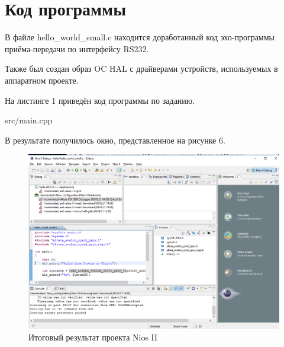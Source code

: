 \section*{Код программы}
В файле hello\_world\_small.c находится доработанный код эхо-программы приёма-передачи по интерфейсу RS232.

Также был создан образ OC HAL с драйверами устройств, используемых в аппаратном проекте.

На листинге 1 приведён код программы по заданию.

\FloatBarrier
\begin{lstinputlisting}[language=C++, caption=Код для выполнения задания, 
	linerange={1, 16}, basicstyle=\footnotesize\ttfamily, frame=single, breaklines=true]{src/main.cpp}
\end{lstinputlisting}
\FloatBarrier

В результате получилось окно, представленное на рисунке 6.

\FloatBarrier
\begin{figure}[h]
	\begin{center}
		\includegraphics[width=\linewidth]{inc/codeResult.png}
	\end{center}
	\caption{Итоговый результат проекта Nios II}
\end{figure}
\FloatBarrier